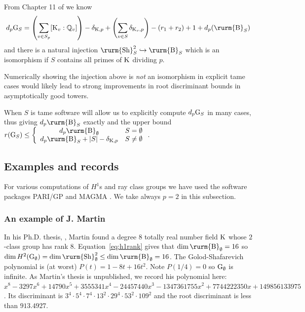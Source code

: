 \documentclass[12pt,a4paper,twoside,english]{smfart}
\def\Q{{\mathbb Q}}
\def\sha{{{\textnormal{\rurm{Sh}}}}}
\def\CyB{{{\textnormal{\rurm{B}}}}}
\def\G{{\rm G}}
\def\K{{\rm K}}
\begin{document}
\smallskip
From Chapter 11 of \cite{Koch} we know 
\begin{equation}\label{eq:h1rank}
d_p \G_S =\left(  \sum_{v\in S_p}[\K_v:\Q_v]  \right) -\delta_{\K,p} +\left( \sum_{v\in S} \delta_{\K_v,p} \right) -(r_1+r_2) +1 +d_p (\CyB_S)
\end{equation}
and there is a natural injection
$  \sha^2_S \hookrightarrow \CyB_S$ which is an isomorphism if
$S$ contains all primes of $\K$ dividing $p$.

\begin{rema}
Numerically showing the injection above is {\it not} an isomorphism
in explicit tame cases would likely lead to strong improvements in root discriminant bounds in asymptotically good towers.
\end{rema}



When $S$ is tame  software will allow us to explicitly compute $d_p \G_S$ in many cases, thus giving $d_p  \CyB_S$  
exactly and the upper bound
$ r(\G_S) \leq \left\{ \begin{array}{cc} d_p \CyB_\emptyset & S=\emptyset \\ d_p \CyB_S +|S| -\delta_{\K,p} & S \neq \emptyset \end{array}\right. .$



 \subsection{Examples and records} 
 For various computations of $H^1$s and ray class groups we have used the software packages  PARI/GP  \cite{pari}  and MAGMA \cite{Magma}.
 We take always $p=2$ in this subsection.

\subsubsection{An example of J. Martin}
  In his Ph.D. thesis, \cite{Martin}, Martin found a degree $8$ totally real number field $\K$ whose $2$-class group has rank $8$. Equation~\eqref{eq:h1rank}
  gives that $\dim \CyB_\emptyset =16$ so $ \dim H^2(\G_\emptyset) =\dim \sha^2_\emptyset  \leq \dim \CyB_\emptyset =16$. The Golod-Shafarevich polynomial is 
  (at worst) $P(t)=1-8t+16t^2$. Note $P(1/4) = 0$  so $\G_\emptyset$ is infinite. As Martin's thesis is unpublished,
  we record his polynomial here: $x^8 - 3297x^6 + 14790x^5 + 3555341x^4 - 24457440x^3 - 1347361755x^2 + 7744222350x +149856133975$.
  Its discriminant is $3^4\cdot5^4\cdot7^4\cdot 13^2\cdot 29^4 \cdot 53^2 \cdot 109^2$ and the root discriminant is less than
  $913.4927$.
  \color{black}
\end{document}
